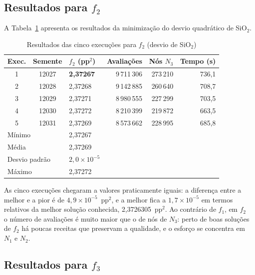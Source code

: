\documentclass[conference]{IEEEtran}
\begin{document}
\subsection{Resultados para $f_2$}

A Tabela~\ref{tab:res_f2} apresenta os resultados da minimização do desvio quadrático de SiO$_2$.

\begin{table}[htbp]
\caption{Resultados das cinco execuções para $f_2$ (desvio de SiO$_2$)}
\centering
\small\setlength{\tabcolsep}{2.8pt}
\begin{tabular}{c c l r r r}
\toprule
\textbf{Exec.} & \textbf{Semente} & \textbf{$f_2$ (pp$^2$)} & \textbf{Avaliações} & \textbf{Nós $N_3$} & \textbf{Tempo (s)} \\
\midrule
1 & 12027 & \textbf{2{,}37267} & 9\,711\,306 & 273\,210 & 736{,}1 \\
2 & 12028 & 2{,}37268 & 9\,142\,885 & 260\,640 & 708{,}7 \\
3 & 12029 & 2{,}37271 & 8\,980\,555 & 227\,299 & 703{,}5 \\
4 & 12030 & 2{,}37272 & 8\,210\,399 & 219\,872 & 663{,}5 \\
5 & 12031 & 2{,}37269 & 8\,573\,662 & 228\,995 & 685{,}8 \\
\midrule
\multicolumn{2}{l}{Mínimo} & 2{,}37267 & & & \\
\multicolumn{2}{l}{Média} & 2{,}37269 & & & \\
\multicolumn{2}{l}{Desvio padrão} & $2{,}0\times10^{-5}$ & & & \\
\multicolumn{2}{l}{Máximo} & 2{,}37272 & & & \\
\bottomrule
\end{tabular}
\label{tab:res_f2}
\end{table}

As cinco execuções chegaram a valores praticamente iguais: a diferença entre a melhor e a pior é de $4{,}9\times10^{-5}$~pp$^2$, e a melhor fica a $1{,}7\times10^{-5}$ em termos relativos da melhor solução conhecida, 2{,}3726305~pp$^2$. Ao contrário de $f_1$, em $f_2$ o número de avaliações é muito maior que o de nós de $N_3$: perto de boas soluções de $f_2$ há poucas receitas que preservam a qualidade, e o esforço se concentra em $N_1$ e $N_2$.

\subsection{Resultados para $f_3$}
\end{document}
